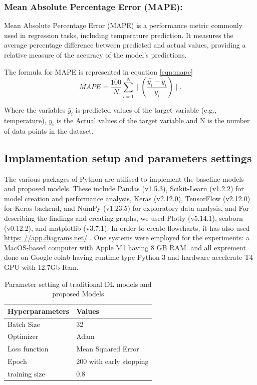 \documentclass[sn-mathphys,Numbered]{sn-jnl}
\theoremstyle{thmstyleone}
\theoremstyle{thmstyletwo}
\theoremstyle{thmstylethree}
\begin{document}
\subsubsection {Mean Absolute Percentage Error (MAPE):}
Mean Absolute Percentage Error (MAPE) is a performance metric commonly used in regression tasks, including temperature prediction. It measures the average percentage difference between predicted and actual values, providing a relative measure of the accuracy of the model's predictions.

The formula for MAPE is represented in equation \ref{eqn:mape}
\begin{equation}
\label{eqn:mape}
MAPE = \frac{100}{N} \sum_{i=1}^{N} \mid(\frac{\hat{y_{i}} - y_{i}}{y_i})\mid .
\end{equation}


Where the variables $\hat{y}_i$ is predicted values of the target variable (e.g., temperature), $y_i$ is the Actual values of the target variable and N is the number of data points in the dataset.



\subsection{Implamentation setup and parameters settings}
The various packages of Python are utilised to implement the baseline models and  proposed models. These include Pandas (v1.5.3), Scikit-Learn (v1.2.2) for model creation and performance analysis, Keras (v2.12.0), TensorFlow (v2.12.0) for Keras backend, and NumPy (v1.23.5) for exploratory data analysis,  and For describing the findings and creating graphs, we used Plotly (v5.14.1), seaborn (v0.12.2), and matplotlib (v3.7.1). In order to create flowcharts, it has also used \href{https: //app.diagrams.net/}{https: //app.diagrams.net/} . One systems were employed for the experiments:  a MacOS-based computer with Apple M1 having 8 GB RAM. and all exprement done on Google colab having runtime type Python 3 and hardware accelerate T4 GPU with 12.7Gb Ram.

\begin{table}[h!]
  \caption{Parameter setting of traditional DL models and proposed Models}
  \label{tab: my-table}
  \begin{tabular}{ll}
  \hline Hyperparameters & Values        \\ \hline
  Batch Size               & 32                     \\
  Optimizer                 & Adam                   \\
  Loss function            & Mean Squared Error      \\
  Epoch                    & 200 with early stopping \\
  training size             & 0.8                   \\ \hline
  \end{tabular}
  \end{table}
\end{document}
